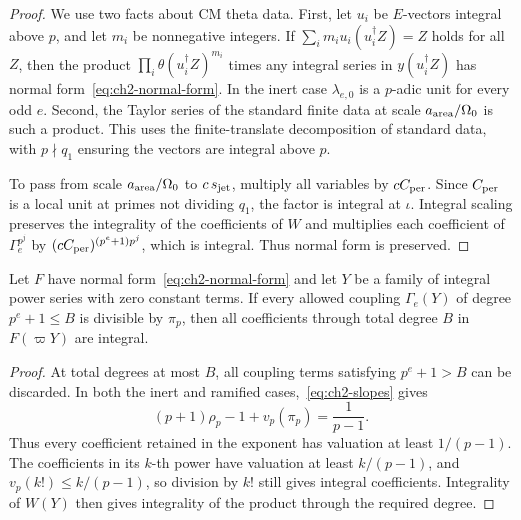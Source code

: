 \begin{proof}
We use two facts about CM theta data. First, let $u_i$ be $E$-vectors integral above $p$, and let $m_i$ be nonnegative integers. If $\sum_i m_i u_i(u_i^\dagger Z)=Z$ holds for all $Z$, then the product $\prod_i\theta(u_i^\dagger Z)^{m_i}$ times any integral series in $y(u_i^\dagger Z)$ has normal form~\eqref{eq:ch2-normal-form}. In the inert case $\lambda_{e,0}$ is a $p$-adic unit for every odd $e$. Second, the Taylor series of the standard finite data at scale $a_{\rm area}/\Omega_0$ is such a product. This uses the finite-translate decomposition of standard data, with $p\nmid q_1$ ensuring the vectors are integral above $p$.

To pass from scale $a_{\rm area}/\Omega_0$ to $c\,s_{\rm jet}$, multiply all variables by $cC_{\rm per}$. Since $C_{\rm per}$ is a local unit at primes not dividing $q_1$, the factor is integral at $\iota$. Integral scaling preserves the integrality of the coefficients of $W$ and multiplies each coefficient of $\Gamma_e^{p^j}$ by $(cC_{\rm per})^{(p^e+1)p^j}$, which is integral. Thus normal form is preserved.
\end{proof}

\begin{lemma}
\label{lem:ch2-truncated-integrality}
Let $F$ have normal form~\eqref{eq:ch2-normal-form} and let $Y$ be a family of integral power series with zero constant terms. If every allowed coupling $\Gamma_e(Y)$ of degree $p^e+1\le B$ is divisible by $\pi_p$, then all coefficients through total degree $B$ in $F(\varpi Y)$ are integral.
\end{lemma}

\begin{proof}
At total degrees at most $B$, all coupling terms satisfying $p^e+1>B$ can be discarded. In both the inert and ramified cases,~\eqref{eq:ch2-slopes} gives
\begin{equation}
\label{eq:ch2-exp-valuation}
 (p+1)\rho_p-1+v_p(\pi_p)=\frac1{p-1}.
\end{equation}
Thus every coefficient retained in the exponent has valuation at least $1/(p-1)$. The coefficients in its $k$-th power have valuation at least $k/(p-1)$, and $v_p(k!)\le k/(p-1)$, so division by $k!$ still gives integral coefficients. Integrality of $W(Y)$ then gives integrality of the product through the required degree.
\end{proof}

